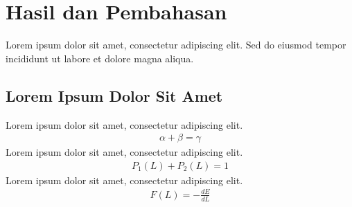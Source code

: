 \chapter{Hasil dan Pembahasan}

\par Lorem ipsum dolor sit amet, consectetur adipiscing elit. Sed do eiusmod tempor incididunt ut labore et dolore magna aliqua.

\section{Lorem Ipsum Dolor Sit Amet}
Lorem ipsum dolor sit amet, consectetur adipiscing elit.
\begin{align}
    \alpha + \beta = \gamma
\end{align}
Lorem ipsum dolor sit amet, consectetur adipiscing elit.
\begin{align}
    P_1(L) + P_2(L) = 1
\end{align}
Lorem ipsum dolor sit amet, consectetur adipiscing elit.
\begin{align}
    F(L) = -\frac{dE}{dL}
\end{align}
